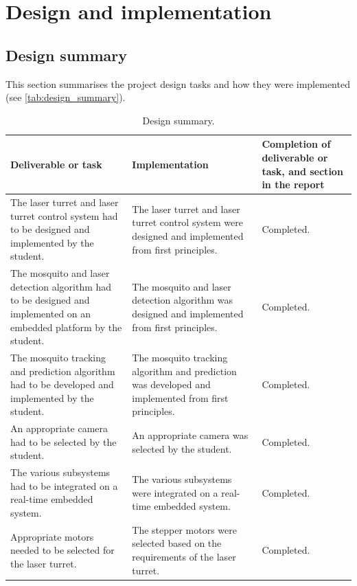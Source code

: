 
\section{Design and implementation}
\subsection{Design summary}
This section summarises the project design tasks and how they were
implemented (see \autoref{tab:design_summary}).
\begin{table}[H]
  \centering
  \begin{tabularx}{\textwidth}{|X|X|X|}
    \hline
    \textbf{Deliverable or task}                                                                                          & \textbf{Implementation}                                                                               &
    \textbf{Completion of deliverable or task, and section in the report}
    \\
    \hline
    The laser turret and laser turret control system had to be designed and implemented by the student.                   & The laser turret and laser turret control system were designed and implemented from first principles. & Completed.
    \\
    \hline
    The mosquito and laser detection algorithm had to be designed and implemented on an embedded platform by the student. & The mosquito and laser detection algorithm was designed and implemented from first principles.        & Completed.
    \\
    \hline
    The mosquito tracking and prediction algorithm had to be developed and implemented by the student.                    & The mosquito tracking algorithm and prediction was developed and implemented from first principles.   & Completed.
    \\
    \hline
    An appropriate camera had to be selected by the student.                                                              & An appropriate camera was selected by the student.                                                    & Completed.
    \\
    \hline
    \hline
    The various subsystems had to be integrated on a real-time embedded system.                                           &
    The various subsystems were integrated on a real-time embedded system.                                                &
    Completed.
    \\
    \hline
    Appropriate motors needed to be selected for the laser turret.                                                        &
    The stepper motors were selected based on the requirements of the laser turret.                                       &
    Completed.
    \\
    \hline
  \end{tabularx}
  \caption{Design summary.}
  \label{tab:design_summary}
\end{table}


